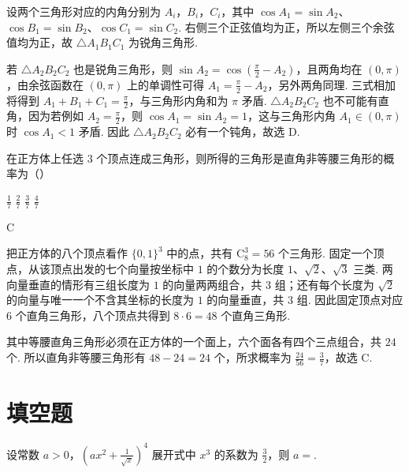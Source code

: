 \begin{solution}
设两个三角形对应的内角分别为 \(A_i\)，\(B_i\)，\(C_i\)，其中 \(\cos A_1=\sin A_2\)、\(\cos B_1=\sin B_2\)、\(\cos C_1=\sin C_2\). 右侧三个正弦值均为正，所以左侧三个余弦值均为正，故 \(\triangle A_1B_1C_1\) 为锐角三角形.

若 \(\triangle A_2B_2C_2\) 也是锐角三角形，则 \(\sin A_2=\cos\left(\frac\pi2-A_2\right)\)，且两角均在 \((0,\pi)\)，由余弦函数在 \((0,\pi)\) 上的单调性可得 \(A_1=\frac\pi2-A_2\)，另外两角同理. 三式相加将得到 \(A_1+B_1+C_1=\frac\pi2\)，与三角形内角和为 \(\pi\) 矛盾. \(\triangle A_2B_2C_2\) 也不可能有直角，因为若例如 \(A_2=\frac\pi2\)，则 \(\cos A_1=\sin A_2=1\)，这与三角形内角 \(A_1\in(0,\pi)\) 时 \(\cos A_1<1\) 矛盾. 因此 \(\triangle A_2B_2C_2\) 必有一个钝角，故选 D.
\end{solution}

\begin{problem}
在正方体上任选 \(3\) 个顶点连成三角形，则所得的三角形是直角非等腰三角形的概率为（\quad）

\choices
    {\(\frac{1}{7}\)}
    {\(\frac{2}{7}\)}
    {\(\frac{3}{7}\)}
    {\(\frac{4}{7}\)}
\end{problem}

\begin{answer}
C
\end{answer}

\begin{solution}
把正方体的八个顶点看作 \(\{0,1\}^3\) 中的点，共有 \(\mathrm C_8^3=56\) 个三角形. 固定一个顶点，从该顶点出发的七个向量按坐标中 \(1\) 的个数分为长度 \(1\)、\(\sqrt2\)、\(\sqrt3\) 三类. 两向量垂直的情形有三组长度为 \(1\) 的向量两两组合，共 \(3\) 组；还有每个长度为 \(\sqrt2\) 的向量与唯一一个不含其坐标的长度为 \(1\) 的向量垂直，共 \(3\) 组. 因此固定顶点对应 \(6\) 个直角三角形，八个顶点共得到 \(8\cdot6=48\) 个直角三角形.

其中等腰直角三角形必须在正方体的一个面上，六个面各有四个三点组合，共 \(24\) 个. 所以直角非等腰三角形有 \(48-24=24\) 个，所求概率为 \(\frac{24}{56}=\frac37\)，故选 C.
\end{solution}

\section{填空题}
\begin{problem}
设常数 \(a > 0\)，\(\left(a x^2 + \frac{1}{\sqrt{x}}\right)^4\) 展开式中 \(x^3\) 的系数为 \(\frac{3}{2}\)，则 \(a = \)\fillinblank{}.
\end{problem}


